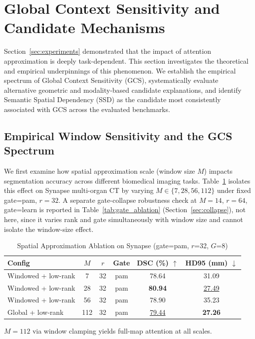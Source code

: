 \section{Global Context Sensitivity and Candidate Mechanisms}
\label{sec:gcs_mechanism}
\label{sec:understanding}

Section~\ref{sec:experiments} demonstrated that the impact of attention approximation is deeply task-dependent. This section investigates the theoretical and empirical underpinnings of this phenomenon. We establish the empirical spectrum of Global Context Sensitivity (GCS), systematically evaluate alternative geometric and modality-based candidate explanations, and identify Semantic Spatial Dependency (SSD) as the candidate most consistently associated with GCS across the evaluated benchmarks.

\subsection{Empirical Window Sensitivity and the GCS Spectrum}
\label{sec:approx_scale}
\label{sec:obs2}

We first examine how spatial approximation scale (window size $M$) impacts segmentation accuracy across different biomedical imaging tasks. Table~\ref{tab:window_ablation} isolates this effect on Synapse multi-organ CT by varying $M \in \{7, 28, 56, 112\}$ under fixed gate=pam, $r{=}32$. A separate gate-collapse robustness check at $M{=}14$, $r{=}64$, gate=learn is reported in Table~\ref{tab:gate_ablation} (Section~\ref{sec:collapse}), not here, since it varies rank and gate simultaneously with window size and cannot isolate the window-size effect.

\begin{table}[ht]
  \caption{Spatial Approximation Ablation on Synapse (gate=pam, $r$=32, $G$=8)}
  \label{tab:window_ablation}
  \centering
  \setlength{\tabcolsep}{2pt}
  \small
  \begin{tabular}{lccccc}
    \toprule
    Config & $M$ & $r$ & Gate & DSC (\%) $\uparrow$ & HD95 (mm) $\downarrow$ \\
    \midrule
    Windowed + low-rank & 7   & 32 & pam          & 78.64          & 31.09 \\
    Windowed + low-rank & 28  & 32 & pam          & \textbf{80.94} & \underline{27.49} \\
    Windowed + low-rank & 56  & 32 & pam          & 78.90          & 35.23 \\
    Global + low-rank   & 112 & 32 & pam          & \underline{79.44} & \textbf{27.26} \\
    \bottomrule
  \end{tabular}
  \par\vspace{5pt}
  \parbox{\columnwidth}{\footnotesize $M{=}112$ via window clamping yields full-map attention at all scales.}
\end{table}

